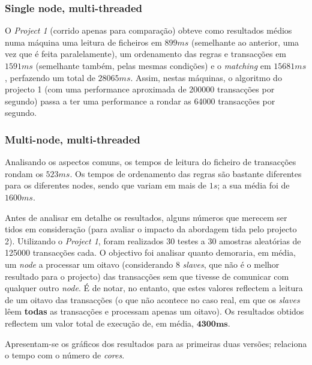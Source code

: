 \documentclass[a4paper]{article}
\begin{document}
\subsubsection{Single node, multi-threaded}
\indent \indent O \textit{Project 1} (corrido apenas para comparação) obteve como resultados médios numa máquina uma leitura de ficheiros em $899ms$ (semelhante ao anterior, uma vez que é feita paralelamente), um ordenamento das regras e transacções em $1591ms$ (semelhante também, pelas mesmas condições) e o \textit{matching} em $15681ms$, perfazendo um total de $28065ms$. Assim, nestas máquinas, o algoritmo do projecto 1 (com uma performance aproximada de 200000 transacções por segundo) passa a ter uma performance a rondar as 64000 transacções por segundo.

\subsubsection{Multi-node, multi-threaded}
\indent \indent Analisando os aspectos comuns, os tempos de leitura do ficheiro de transacções rondam os $523ms$. Os tempos de ordenamento das regras são bastante diferentes para os diferentes nodes, sendo que variam em mais de $1s$; a sua média foi de $1600ms$.

Antes de analisar em detalhe os resultados, alguns números que merecem ser tidos em consideração (para avaliar o impacto da abordagem tida pelo projecto 2). Utilizando o \textit{Project 1}, foram realizados 30 testes a 30 amostras aleatórias de 125000 transacções cada. O objectivo foi analisar quanto demoraria, em média, um \textit{node} a processar um oitavo (considerando 8 \textit{slaves}, que não é o melhor resultado para o projecto) das transacções sem que tivesse de comunicar com qualquer outro \textit{node}. É de notar, no entanto, que estes valores reflectem a leitura de um oitavo das transacções (o que não acontece no caso real, em que os \textit{slaves} lêem \textbf{todas} as transacções e processam apenas um oitavo). Os resultados obtidos reflectem um valor total de execução de, em média, $\mathbf{4300ms}$.

Apresentam-se os gráficos dos resultados para as primeiras duas versões; relaciona o tempo com o número de \textit{cores}.
\end{document}
